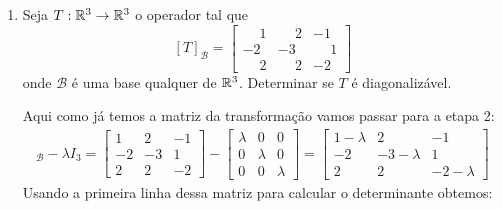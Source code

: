 \begin{exemplo}
\begin{enumerate}[label={\arabic*})]
\begin{solucao}
\begin{itemize}
\[                \]
                e ent\~ao $\mathcal{B}_2 = \{(-7/4,-5/2,1)\}$ \'e uma base de $\aut_T(1)$ e $\dim_\real\aut_T(1) = 1$.
            \end{itemize}
            Note que o conjunto $\mathcal{D} = \mathcal{B}_1 \cup \mathcal{B}_2$ \'e L.I. mas n\~ao \'e uma base de $\real^3$. Neste caso o operador $T$ n\~ao \'e diagonaliz\'avel.
        \end{solucao}
        \item Seja $T : \mathbb{R}^3 \to \mathbb{R}^3$ o operador tal que
        \[
            [T]_\mathcal{B} = \begin{bmatrix}
                                \phantom{-}1 & \phantom{-}2 & -1\\
                                -2 & -3 & \phantom{-}1\\
                                \phantom{-}2 & \phantom{-}2 & -2
                            \end{bmatrix}
        \]
        onde $\mathcal{B}$ \'e uma base qualquer de $\real^3$. Determinar se $T$ \'e diagonaliz\'avel.
        \begin{solucao}
            Aqui como já temos a matriz da transforma\c{c}ão vamos passar para a etapa 2:
            \begin{align*}
                [T]_\mathcal{B} - \lambda I_3 = \begin{bmatrix}1 & 2 & -1\\-2 & -3 & 1\\2 & 2 & -2\end{bmatrix} - \begin{bmatrix} \lambda & 0 & 0\\0 & \lambda & 0\\0 & 0 & \lambda\end{bmatrix} = \begin{bmatrix}1 - \lambda & 2 & -1\\-2 & -3 - \lambda & 1\\2 & 2 &-2 - \lambda\end{bmatrix}
            \end{align*}
            Usando a primeira linha dessa matriz para calcular o determinante obtemos:
            \begin{align*}

\end{align*}
\end{solucao}
\end{enumerate}
\end{exemplo}
